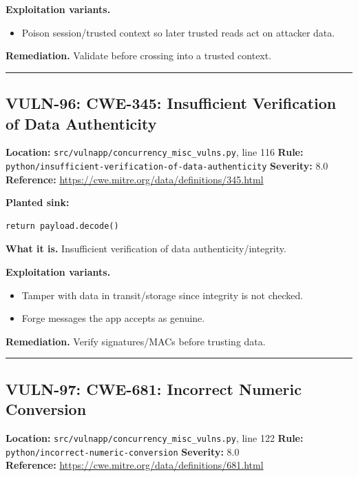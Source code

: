 \documentclass[11pt,a4paper]{article}
\begin{document}
\noindent\textbf{Exploitation variants.}
\begin{itemize}[leftmargin=1.4em,itemsep=1pt,topsep=2pt]
\item Poison session/trusted context so later trusted reads act on attacker data.
\end{itemize}
\noindent\textbf{Remediation.} Validate before crossing into a trusted context.

\vspace{4pt}\hrule\vspace{6pt}
\subsection{VULN-96: CWE-345: Insufficient Verification of Data Authenticity}
\noindent\textbf{Location:} \texttt{src/vulnapp/concurrency\_misc\_vulns.py}, line 116 \quad \textbf{Rule:} \texttt{python/insufficient-verification-of-data-authenticity} \quad \textbf{Severity:} 8.0
\\ \textbf{Reference:} \url{https://cwe.mitre.org/data/definitions/345.html}

\noindent\textbf{Planted sink:}
\begin{lstlisting}
return payload.decode()
\end{lstlisting}
\noindent\textbf{What it is.} Insufficient verification of data authenticity/integrity.

\noindent\textbf{Exploitation variants.}
\begin{itemize}[leftmargin=1.4em,itemsep=1pt,topsep=2pt]
\item Tamper with data in transit/storage since integrity is not checked.
\item Forge messages the app accepts as genuine.
\end{itemize}
\noindent\textbf{Remediation.} Verify signatures/MACs before trusting data.

\vspace{4pt}\hrule\vspace{6pt}
\subsection{VULN-97: CWE-681: Incorrect Numeric Conversion}
\noindent\textbf{Location:} \texttt{src/vulnapp/concurrency\_misc\_vulns.py}, line 122 \quad \textbf{Rule:} \texttt{python/incorrect-numeric-conversion} \quad \textbf{Severity:} 8.0
\\ \textbf{Reference:} \url{https://cwe.mitre.org/data/definitions/681.html}
\end{document}
